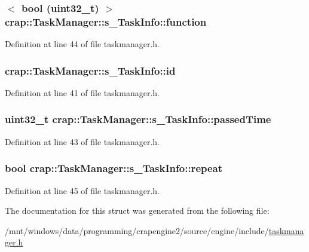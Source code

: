 \subsubsection[{function}]{$<$ bool (uint32\+\_\+t) $>$ crap\+::\+Task\+Manager\+::s\+\_\+\+Task\+Info\+::function}\label{structcrap_1_1_task_manager_1_1s___task_info_a4361477d8a4d9eef935f84980989a1f5}


Definition at line 44 of file taskmanager.\+h.

\hypertarget{structcrap_1_1_task_manager_1_1s___task_info_a5287e8ec5a4f307ba815ec41f05ba674}{}
\subsubsection[{id}]{ crap\+::\+Task\+Manager\+::s\+\_\+\+Task\+Info\+::id}\label{structcrap_1_1_task_manager_1_1s___task_info_a5287e8ec5a4f307ba815ec41f05ba674}


Definition at line 41 of file taskmanager.\+h.

\hypertarget{structcrap_1_1_task_manager_1_1s___task_info_aeb218208ca06a73ac808eefb1b151a65}{}
\subsubsection[{passed\+Time}]{\setlength{\rightskip}{0pt plus 5cm}uint32\+\_\+t crap\+::\+Task\+Manager\+::s\+\_\+\+Task\+Info\+::passed\+Time}\label{structcrap_1_1_task_manager_1_1s___task_info_aeb218208ca06a73ac808eefb1b151a65}


Definition at line 43 of file taskmanager.\+h.

\hypertarget{structcrap_1_1_task_manager_1_1s___task_info_a3e51e99cb4edbd871cda5562d8814b42}{}
\subsubsection[{repeat}]{\setlength{\rightskip}{0pt plus 5cm}bool crap\+::\+Task\+Manager\+::s\+\_\+\+Task\+Info\+::repeat}\label{structcrap_1_1_task_manager_1_1s___task_info_a3e51e99cb4edbd871cda5562d8814b42}


Definition at line 45 of file taskmanager.\+h.



The documentation for this struct was generated from the following file\+:\begin{DoxyCompactItemize}
\item 
/mnt/windows/data/programming/crapengine2/source/engine/include/\hyperlink{taskmanager_8h}{taskmanager.\+h}\end{DoxyCompactItemize}
